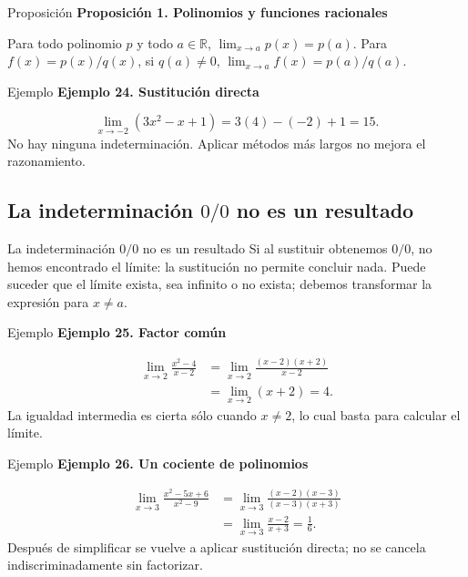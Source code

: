\documentclass[12pt,aspectratio=169]{beamer}
\newcommand{\R}{\mathbb{R}}
\begin{document}
\begin{frame}[t,allowframebreaks]{Proposición}
{\color{azul}\bfseries Proposición 1. Polinomios y funciones racionales}\par\medskip

Para todo polinomio $p$ y todo $a\in\R$, $\lim_{x\to a}p(x)=p(a)$. Para $f(x)=p(x)/q(x)$, si $q(a)\ne0$, $\lim_{x\to a}f(x)=p(a)/q(a)$.
\end{frame}


\begin{frame}[t,allowframebreaks]{Ejemplo}
{\color{azul}\bfseries Ejemplo 24. Sustitución directa}\par\medskip

\[
 \lim_{x\to-2}(3x^2-x+1)=3(4)-(-2)+1=\boxed{15}.
\]
No hay ninguna indeterminación. Aplicar métodos más largos no mejora el razonamiento.
\end{frame}


\subsection{La indeterminación $0/0$ no es un resultado}

\begin{frame}[t,allowframebreaks]{La indeterminación $0/0$ no es un resultado}
Si al sustituir obtenemos $0/0$, no hemos encontrado el límite: la sustitución no permite concluir nada. Puede suceder que el límite exista, sea infinito o no exista; debemos transformar la expresión para $x\ne a$.
\end{frame}


\begin{frame}[t,allowframebreaks]{Ejemplo}
{\color{azul}\bfseries Ejemplo 25. Factor común}\par\medskip

\begin{align*}
 \lim_{x\to2}\frac{x^2-4}{x-2}
 &=\lim_{x\to2}\frac{(x-2)(x+2)}{x-2}\\
 &=\lim_{x\to2}(x+2)=\boxed{4}.
\end{align*}
La igualdad intermedia es cierta sólo cuando $x\ne2$, lo cual basta para calcular el límite.
\end{frame}


\begin{frame}[t,allowframebreaks]{Ejemplo}
{\color{azul}\bfseries Ejemplo 26. Un cociente de polinomios}\par\medskip

\begin{align*}
\lim_{x\to3}\frac{x^2-5x+6}{x^2-9}
 &=\lim_{x\to3}\frac{(x-2)(x-3)}{(x-3)(x+3)}\\
 &=\lim_{x\to3}\frac{x-2}{x+3}=\boxed{\frac16}.
\end{align*}
Después de simplificar se vuelve a aplicar sustitución directa; no se cancela indiscriminadamente sin factorizar.
\end{frame}
\end{document}
